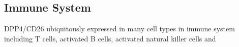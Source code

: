 \subsection{Immune System}
DPP4/CD26 ubiquitously expressed in many cell types in immune system including T cells, activated B cells, activated natural killer cells and 